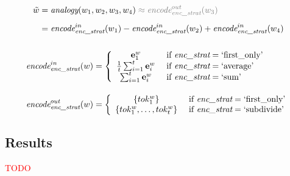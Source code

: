 \documentclass[aspectratio=169, 12pt]{beamer}
\newcommand{\gbm}[1]{\bm{\mathbf{#1}}} %
\begin{document}
    \begin{frame}{}
        \begin{equation*}
            \begin{gathered}
                \begin{aligned}
                    \tilde w &= \textit{analogy}(w_1, w_2, w_3, w_4) \color{gray} \approx {\textit{encode}}_{\textit{enc\_strat}}^{out}(w_3) \\[5pt]
                    &= {\textit{encode}}_{\textit{enc\_strat}}^{in}(w_1) - {\textit{encode}}_{\textit{enc\_strat}}^{in}(w_2) + {\textit{encode}}_{\textit{enc\_strat}}^{in}(w_4)
                \end{aligned} \\[15pt]
                \begin{aligned}
                    {\textit{encode}}_{\textit{enc\_strat}}^{in}(w) &= 
                    \left\{
                    \begin{array}{cl}
                        \gbm{e}_1^w &\ \text{if}\ \textit{enc\_strat} = \text{`first\_only'} \\
                        \frac{1}{t}\sum_{i=1}^{t}{\gbm{e}_i^w} &\ \text{if}\ \textit{enc\_strat} = \text{`average'} \\
                        \sum_{i=1}^{t}{\gbm{e}_i^w} &\ \text{if}\ \textit{enc\_strat} = \text{`sum'}
                    \end{array}
                    \right. \\[10pt]
                    {\textit{encode}}_{\textit{enc\_strat}}^{out}(w) &= 
                    \left\{
                    \begin{array}{cl}
                        \{ tok_1^w \} &\ \text{if}\ \textit{enc\_strat} = \text{`first\_only'} \\
                        \{ tok_1^w, \ldots, tok_t^w \} &\ \text{if}\ \textit{enc\_strat} = \text{`subdivide'}
                    \end{array}
                    \right.
                \end{aligned}
            \end{gathered}
        \end{equation*}
    \end{frame}

    \subsection{Results}
    \begin{frame}{}
        \textcolor{red}{TODO}
    \end{frame}
\end{document}
